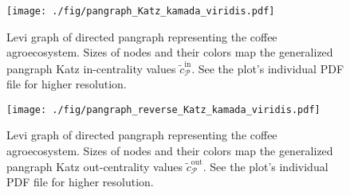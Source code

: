 \documentclass[a4paper,12pt]{article}
\theoremstyle{definition}
\theoremstyle{remark}
\newcommand{\mP}{\mathcal{P}}
\begin{document}
\begin{figure}[ht]
	\begin{center}
        \texttt{[image: ./fig/pangraph\_Katz\_kamada\_viridis.pdf]}
        \caption{Levi graph of directed pangraph representing the coffee agroecosystem. Sizes of nodes and their colors map the generalized pangraph Katz in-centrality values $\tilde{c}_{\mP}^{\textrm{in}}$. See the plot's individual PDF file for higher resolution.} 
    	\label{fig:Katz_graph_pan_in}
    \end{center}
\end{figure}

\begin{figure}[ht]
	\begin{center}
        \texttt{[image: ./fig/pangraph\_reverse\_Katz\_kamada\_viridis.pdf]}
        \caption{Levi graph of directed pangraph representing the coffee agroecosystem. Sizes of nodes and their colors map the generalized pangraph Katz out-centrality values $\tilde{c}_{\mP}^{\textrm{out}}$. See the plot's individual PDF file for higher resolution.} 
    	\label{fig:Katz_graph_pan_out}
    \end{center}
\end{figure}
\end{document}

